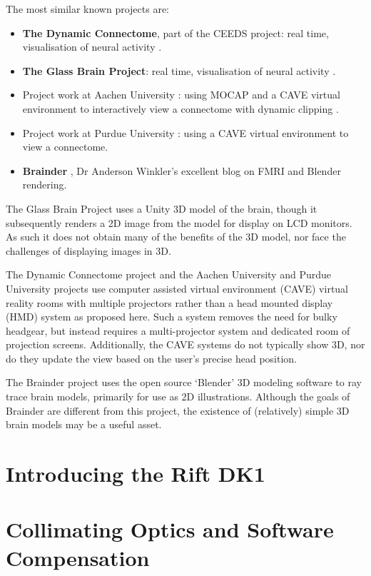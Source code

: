 \documentclass[MSc,paper=a4,pagesize=auto]{icldt}
\begin{document}
The most similar known projects are:
\begin{itemize}
  \item \textbf{The Dynamic Connectome}, part of the CEEDS project: real time, visualisation of neural activity \cite{ceeds2014}.
  \item \textbf{The Glass Brain Project}: real time, visualisation of neural activity \cite{GlassBrain2014}.
  \item Project work at Aachen University \cite{Rick2011}: using MOCAP and a CAVE virtual environment to interactively view a connectome with dynamic clipping \cite{ceeds2014}.
  \item Project work at Purdue University \cite{Chen2011}: using a CAVE virtual environment to view a connectome.
  \item \textbf{Brainder} \cite{brainder2014}, Dr Anderson Winkler’s excellent blog on FMRI and Blender rendering.
\end{itemize}

The Glass Brain Project uses a Unity 3D model of the brain, though it subsequently renders a 2D image from the model for display on LCD monitors. As such it does not obtain many of the benefits of the 3D model, nor face the challenges of displaying images in 3D.

The Dynamic Connectome project and the Aachen University and Purdue University projects use computer assisted virtual environment (CAVE) virtual reality rooms with multiple projectors rather than a head mounted display (HMD) system as proposed here. Such a system removes the need for bulky headgear, but instead requires a multi-projector system and dedicated room of projection screens. Additionally, the CAVE systems do not typically show 3D, nor do they update the view based on the user’s precise head position.

The Brainder project uses the open source ‘Blender’ 3D modeling software to ray trace brain models, primarily for use as 2D illustrations. Although the goals of Brainder are different from this project, the existence of (relatively) simple 3D brain models may be a useful asset. 



\section{Introducing the Rift DK1}
\section{Collimating Optics and Software Compensation}
\end{document}
